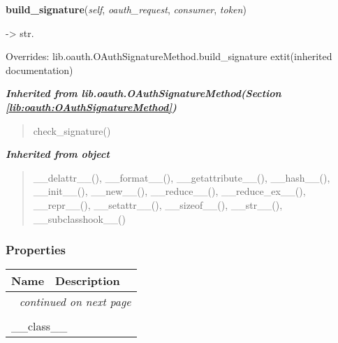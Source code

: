     \vspace{0.5ex}

\hspace{.8\funcindent}\begin{boxedminipage}{\funcwidth}

    \raggedright \textbf{build\_signature}(\textit{self}, \textit{oauth\_request}, \textit{consumer}, \textit{token})

\setlength{\parskip}{2ex}
    -{\textgreater} str.

\setlength{\parskip}{1ex}
      Overrides: lib.oauth.OAuthSignatureMethod.build\_signature 	extit{(inherited documentation)}

    \end{boxedminipage}


\large{\textbf{\textit{Inherited from lib.oauth.OAuthSignatureMethod\textit{(Section \ref{lib:oauth:OAuthSignatureMethod})}}}}

\begin{quote}
check\_signature()
\end{quote}

\large{\textbf{\textit{Inherited from object}}}

\begin{quote}
\_\_delattr\_\_(), \_\_format\_\_(), \_\_getattribute\_\_(), \_\_hash\_\_(), \_\_init\_\_(), \_\_new\_\_(), \_\_reduce\_\_(), \_\_reduce\_ex\_\_(), \_\_repr\_\_(), \_\_setattr\_\_(), \_\_sizeof\_\_(), \_\_str\_\_(), \_\_subclasshook\_\_()
\end{quote}


  \subsubsection{Properties}

    \vspace{-1cm}
\hspace{\varindent}\begin{longtable}{|p{\varnamewidth}|p{\vardescrwidth}|l}
\cline{1-2}
\cline{1-2} \centering \textbf{Name} & \centering \textbf{Description}& \\
\cline{1-2}
\endhead\cline{1-2}\multicolumn{3}{r}{\small\textit{continued on next page}}\\\endfoot\cline{1-2}
\endlastfoot\multicolumn{2}{|l|}{\textit{Inherited from object}}\\
\multicolumn{2}{|p{\varwidth}|}{\raggedright \_\_class\_\_}\\
\cline{1-2}
\end{longtable}


